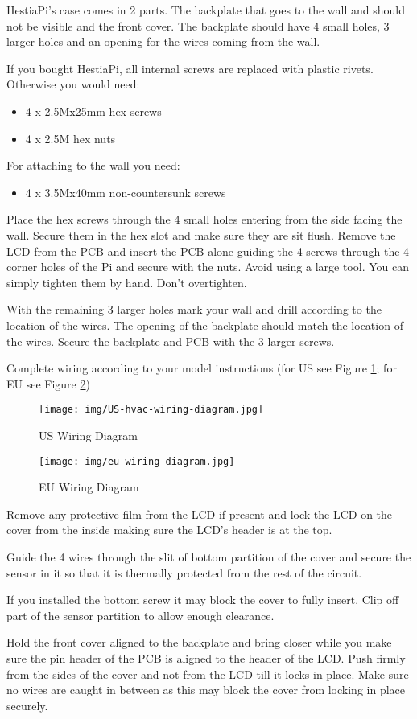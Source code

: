 HestiaPi's case comes in 2 parts. The backplate that goes to the wall and
should not be visible and the front cover. The backplate should have 4 small
holes, 3 larger holes and an opening for the wires coming from the wall.

If you bought HestiaPi, all internal screws are replaced with plastic rivets.
Otherwise you would need:

\begin{itemize}
\item 4 x 2.5Mx25mm hex screws
\item 4 x 2.5M hex nuts
\end{itemize}

For attaching to the wall you need:
\begin{itemize}
\item 4 x 3.5Mx40mm non-countersunk screws
\end{itemize}

Place the hex screws through the 4 small holes entering from the side facing
the wall. Secure them in the hex slot and make sure they are sit flush. Remove
the LCD from the PCB and insert the PCB alone guiding the 4 screws through the
4 corner holes of the Pi and secure with the nuts. Avoid using a large tool.
You can simply tighten them by hand. Don't overtighten.

With the remaining 3 larger holes mark your wall and drill according to the
location of the wires. The opening of the backplate should match the location
of the wires. Secure the backplate and PCB with the 3 larger screws.

Complete wiring according to your model instructions (for US see Figure
\ref{fig:us}; for EU see Figure \ref{fig:eu})

\begin{figure}
  \texttt{[image: img/US-hvac-wiring-diagram.jpg]}
  \caption{US Wiring Diagram}
  \label{fig:us}
\end{figure}

\begin{figure}
  \texttt{[image: img/eu-wiring-diagram.jpg]}
  \caption{EU Wiring Diagram}
  \label{fig:eu}
\end{figure}

Remove any protective film from the LCD if present and lock the LCD on the
cover from the inside making sure the LCD's header is at the top.

Guide the 4 wires through the slit of bottom partition of the cover and secure
the sensor in it so that it is thermally protected from the rest of the
circuit.

If you installed the bottom screw it may block the cover to fully insert. Clip
off part of the sensor partition to allow enough clearance.

Hold the front cover aligned to the backplate and bring closer while you make
sure the pin header of the PCB is aligned to the header of the LCD. Push firmly
from the sides of the cover and not from the LCD till it locks in place. Make
sure no wires are caught in between as this may block the cover from locking in
place securely.
